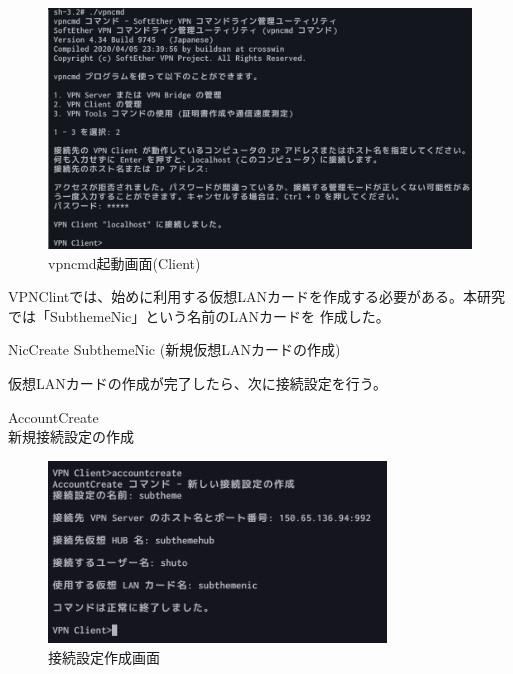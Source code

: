 \documentclass[11pt,a4j,titlepage]{jreport}
\begin{document}
\begin{figure}[H]
    \centering
    \includegraphics*[width=1.0\textwidth,page=1]{graphs/clientconfig3.png}
    \caption{vpncmd起動画面(Client)}
    \label{clientconfig}
\end{figure}
VPNClintでは、始めに利用する仮想LANカードを作成する必要がある。本研究では「SubthemeNic」という名前のLANカードを
作成した。
\begin{description}
    \setlength{\parskip}{0.0cm} %
    \setlength{\itemsep}{0.0cm} 
    \item[VPN Client\textgreater] NicCreate SubthemeNic  (新規仮想LANカードの作成)
\end{description}
仮想LANカードの作成が完了したら、次に接続設定を行う。

\begin{description}
    \setlength{\parskip}{0.0cm} %
    \setlength{\itemsep}{0.0cm} 
    \item[VPN Client\textgreater] AccountCreate \\新規接続設定の作成

\end{description}
\fi
\begin{figure}[H]
    \centering
    \includegraphics*[width=0.8\textwidth,page=1]{graphs/accountcreate.png}
    \caption{接続設定作成画面}
    \label{accountcreate}
\end{figure}
\end{document}
